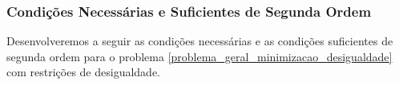 \documentclass[12pt,a4paper]{scrartcl}
\DeclareMathOperator{\posto}{posto}
\theoremstyle{definition}%
\begin{document}


\subsubsection{Condições Necessárias e Suficientes de Segunda Ordem}

Desenvolveremos a seguir as condições necessárias e as condições suficientes de segunda ordem para o problema \eqref{problema_geral_minimizacao_desigualdade} com restrições de desigualdade.
\end{document}
